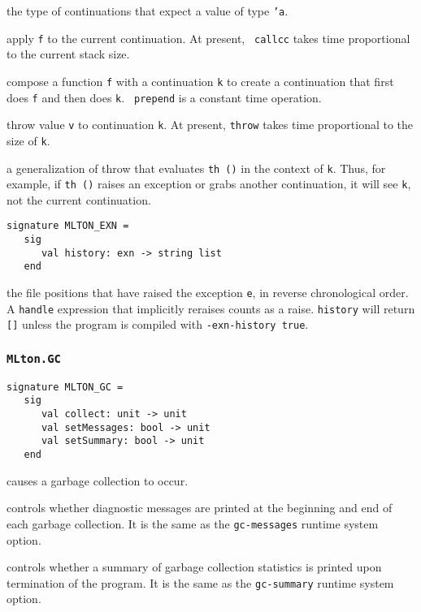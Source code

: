 \begin{description}

the type of continuations that expect a value of type {\tt 'a}.

apply {\tt f} to the current continuation.  At present, {\tt
callcc} takes time proportional to the current stack size.

compose a function {\tt f} with a continuation {\tt k} to create a
continuation that first does {\tt f} and then does {\tt k}.  {\tt
prepend} is a constant time operation.

throw value {\tt v} to continuation {\tt k}.  At present, {\tt throw}
takes time proportional to the size of {\tt k}.

a generalization of throw that evaluates {\tt th ()} in the context
of {\tt k}.  Thus, for example, if {\tt th ()} raises an exception or
grabs another continuation, it will see {\tt k}, not the current
continuation.

\end{description}

\begin{verbatim}
signature MLTON_EXN =
   sig
      val history: exn -> string list
   end
\end{verbatim}

\begin{description}

the file positions that have raised the exception {\tt e}, in reverse
chronological order.   A {\tt handle} expression that implicitly reraises counts
as a raise.  {\tt history} will return {\tt []} unless the program is compiled
with {\tt -exn-history true}.

\end{description}

\subsubsection{{\tt MLton.GC}}
\begin{verbatim}
signature MLTON_GC =
   sig
      val collect: unit -> unit
      val setMessages: bool -> unit
      val setSummary: bool -> unit
   end
\end{verbatim}

\begin{description}
causes a garbage collection to occur.

controls whether diagnostic messages are
printed at the beginning and end of each garbage collection.  It is
the same as the {\tt gc-messages} runtime system option.

controls whether a summary of garbage
collection statistics is printed upon termination of the program.  It
is the same as the {\tt gc-summary} runtime system option.

\end{description}


